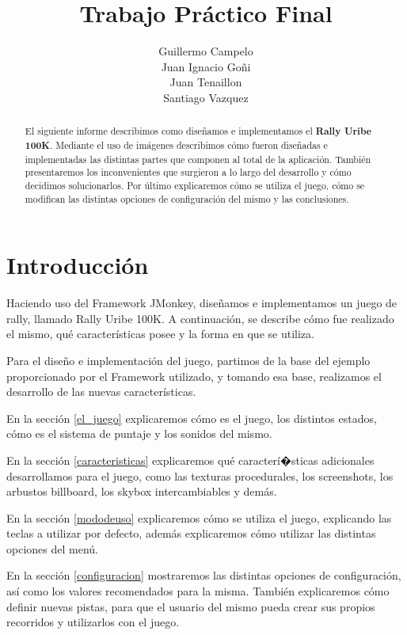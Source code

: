 \documentclass[a4paper,10pt]{article}
\title{Trabajo Pr\'actico Final}
\author{Guillermo Campelo\\Juan Ignacio Go\~ni\\Juan
Tenaillon\\Santiago Vazquez}
\begin{document}
\maketitle

\begin{abstract}
El siguiente informe describimos como dise\~namos e implementamos el
\textbf{Rally
Uribe
100K}. 
Mediante el uso de im\'agenes describimos c\'omo fueron dise\~nadas e
implementadas
las distintas partes que componen al total de la aplicaci\'on.  Tambi\'en
presentaremos los inconvenientes que surgieron a lo largo del desarrollo y
c\'omo decidimos solucionarlos.  Por \'ultimo explicaremos c\'omo se utiliza
el
juego,
c\'omo se modifican las distintas opciones de configuraci\'on del mismo y las
conclusiones.
\end{abstract}

\pagebreak
\tableofcontents
\pagebreak

\section{Introducci\'on}

Haciendo uso del Framework JMonkey, dise\~namos e implementamos un juego de
rally,
llamado Rally Uribe 100K.  A continuaci\'on, se describe c\'omo fue realizado el
mismo, qu\'e caracter\'isticas posee y la forma en que se utiliza.

Para el dise\~no e implementaci\'on del juego, partimos de la base del ejemplo
proporcionado por el Framework utilizado, y tomando esa base, realizamos
el desarrollo de las nuevas caracter\'isticas.

En la secci\'on \ref{el_juego} explicaremos c\'omo es el juego, los distintos
estados, c\'omo es el sistema de puntaje y los sonidos del mismo.

En la secci\'on \ref{caracteristicas} explicaremos qu\'e caracter\'i�sticas
adicionales desarrollamos para el juego, como las texturas procedurales,
los screenshots, los arbustos billboard, los skybox intercambiables y dem\'as.

En la secci\'on \ref{mododeuso} explicaremos c\'omo se utiliza el juego,
explicando
las teclas a utilizar por defecto, adem\'as explicaremos c\'omo utilizar las
distintas opciones del men\'u.

En la secci\'on \ref{configuracion} mostraremos las distintas opciones de
configuraci\'on, as\'i como los valores recomendados para la misma.  Tambi\'en
explicaremos c\'omo definir nuevas pistas, para que el usuario del mismo pueda
crear
sus propios recorridos y utilizarlos con el juego.
\end{document}
